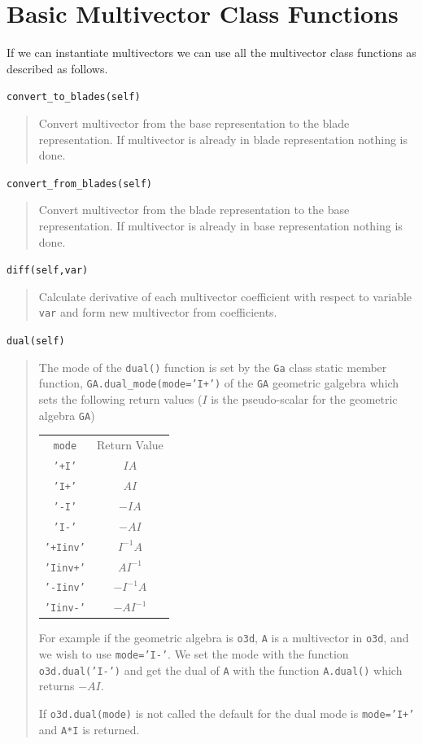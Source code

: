 \documentclass[12pt]{report}
\newcommand{\T}[1]{\texttt{#1}}
\begin{document}
\section{Basic Multivector Class Functions}

If we can instantiate multivectors we can use all the multivector class functions as described as follows.

\T{convert\_to\_blades(self)}
\begin{quote}
   Convert multivector from the base representation to the blade representation.
   If multivector is already in blade representation nothing is done.
\end{quote}

\T{convert\_from\_blades(self)}
\begin{quote}
   Convert multivector from the blade representation to the base representation.
   If multivector is already in base representation nothing is done.
\end{quote}

\T{diff(self,var)}
\begin{quote}
   Calculate derivative of each multivector coefficient with respect to
   variable \T{var} and form new multivector from coefficients.
\end{quote}

\T{dual(self)}
\begin{quote}
   The mode of the \T{dual()} function is set by the \T{Ga} class static member function, \T{GA.dual\_mode(mode='I+')} of the \T{GA} geometric
   galgebra which sets the following return values ($I$ is the pseudo-scalar for the geometric algebra \T{GA})
   \begin{center}
   \begin{tabular}{cc}
        \T{mode} & Return Value \\
        \T{'+I'} & $IA$ \\
        \T{'I+'} & $AI$ \\
        \T{'-I'} & $-IA$ \\
        \T{'I-'} & $-AI$ \\
        \T{'+Iinv'} & $I^{-1}A$ \\
        \T{'Iinv+'} & $AI^{-1}$ \\
        \T{'-Iinv'} & $-I^{-1}A$ \\
        \T{'Iinv-'} & $-AI^{-1}$
   \end{tabular}
   \end{center}

   For example if the geometric algebra is \T{o3d}, \T{A} is a multivector in \T{o3d}, and we wish to use \T{mode='I-'}.  We set
   the mode with the function
   \T{o3d.dual('I-')} and get the dual of \T{A} with the function \T{A.dual()} which returns $-AI$.

   If \T{o3d.dual(mode)} is not called the default for the dual mode is \T{mode='I+'} and \T{A*I} is returned.
\end{quote}
\end{document}
